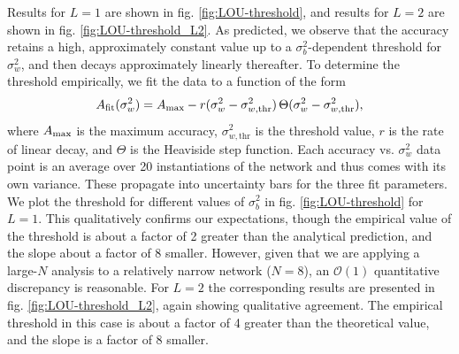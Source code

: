 Results for $L=1$ are shown in fig. \ref{fig:LOU-threshold}, and results for $L=2$ are shown in fig. \ref{fig:LOU-threshold_L2}. As predicted, we observe that the accuracy retains a high, approximately constant value up to a $\sigma_b^2$-dependent threshold for $\sigma_w^2$, and then decays approximately linearly thereafter. To determine the threshold empirically, we fit the data to a function of the form
%
\begin{equation}
	A_{{\rm fit}} ( \sigma_{w}^{2} ) = A_{{\rm max}} - r ( \sigma_{w}^{2} - \sigma_{w, \text{thr}}^{2} ) \, \Theta ( \sigma_{w}^{2} - \sigma_{w, \text{thr}}^{2} ),
\end{equation}
%
where $A_{{\rm max}}$ is the maximum accuracy, $\sigma_{w, \text{thr}}^{2}$ is the threshold value, $r$ is the rate of linear decay, and $\Theta$ is the Heaviside step function. Each accuracy vs. $\sigma_{w}^{2}$ data point is an average over 20 instantiations of the network and thus comes with its own variance. These propagate into uncertainty bars for the three fit parameters. We plot the threshold for different values of $\sigma_{b}^{2}$ in fig. \ref{fig:LOU-threshold} for $L=1$. This qualitatively confirms our expectations, though the empirical value of the threshold is about a factor of 2 greater than the analytical prediction, and the slope about a factor of 8 smaller. However, given that we are applying a large-$N$ analysis to a relatively narrow network ($N=8$), an $\mathcal{O}(1)$ quantitative discrepancy is reasonable. For $L=2$ the corresponding results are presented in 
fig. \ref{fig:LOU-threshold_L2}, again showing qualitative agreement. The empirical threshold in this case is about a factor of 4 greater than the theoretical value, and the slope is a factor of $8$ smaller.

